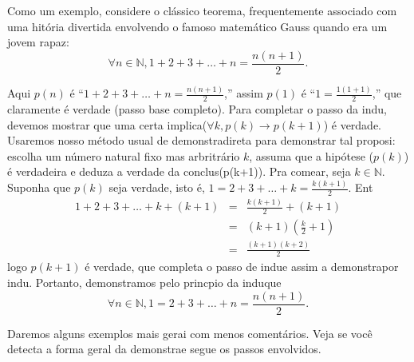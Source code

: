 Como um exemplo, considere o cl\'assico teorema, frequentemente associado com uma hit\'oria divertida envolvendo o famoso matem\'atico Gauss quando era um jovem rapaz:
\[
\forall n\in\mathbb{N}, 1+2+3+\ldots+n=\frac{n(n+1)}{2}.
\]

Aqui $p(n)$ \'e ``$1+2+3+\ldots+n=\frac{n(n+1)}{2}$,'' assim $p(1)$ \'e ``$1=\frac{1(1+1)}{2}$,'' que claramente \'e verdade (passo base completo). Para completar o passo da indu\caoi, devemos mostrar que uma certa implica\cao ($\forall k, p(k)\rightarrow p(k+1)$) \'e verdade. Usaremos nosso m\'etodo usual de demonstra\cao direta para demonstrar tal proposi\caoi: escolha um n\'umero natural fixo mas arbritr\'ario $k$, assuma que a hip\'otese ($p(k)$) \'e verdadeira e deduza a verdade da conclus\ao (p(k+1)). Pra come\cc ar, seja $k\in\mathbb{N}$. Suponha que $p(k)$ seja verdade, isto \'e, $1=2+3+\ldots+k=\frac{k(k+1)}{2}$. Ent\ao
\begin{eqnarray*}
1+2+3+\ldots+k+(k+1)&=& \frac{k(k+1)}{2}+(k+1)\\
                 &=& (k+1)\left(\frac{k}{2}+1\right)\\
                 &=& \frac{(k+1)(k+2)}{2}
\end{eqnarray*}  
logo $p(k+1)$ \'e verdade, que completa o passo de indu\cao e assim a demonstra\cao por indu\caoi. Portanto, demonstramos pelo princ\ih pio da indu\cao que 
\[
\forall n\in\mathbb{N}, 1=2+3+\ldots+n=\frac{n(n+1)}{2}.
\] 

Daremos alguns exemplos mais gerai com menos coment\'arios. Veja se voc\^e detecta a forma geral da demonstra\cao e segue os passos envolvidos.

